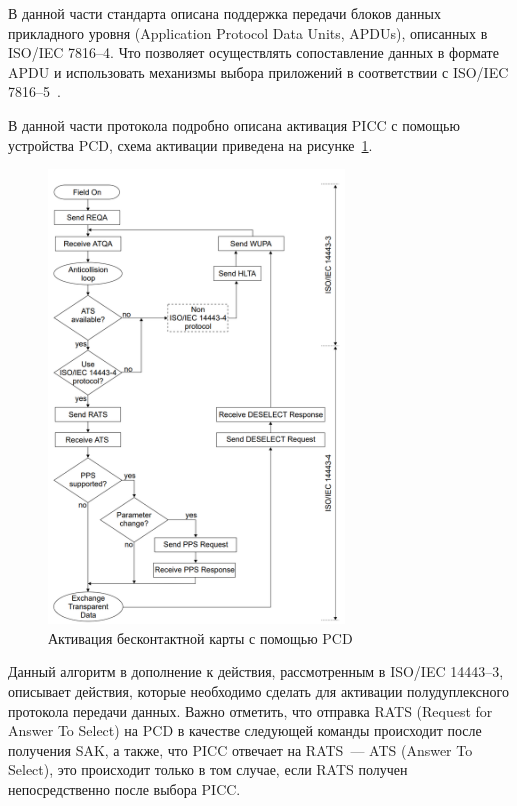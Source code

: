В данной части стандарта описана поддержка передачи блоков данных прикладного уровня (Application Protocol Data Units, APDUs), описанных в ISO/IEC 7816--4.
Что позволяет осуществлять сопоставление данных в формате APDU и использовать механизмы выбора приложений в соответствии с ISO/IEC 7816--5~\cite{iso_14443_en}.

В данной части протокола подробно описана активация PICC с помощью устройства PCD, схема активации приведена на рисунке~\ref{fig:pcd_flow_2_picc_activation}.


\begin{figure}[H]
    \centering
    \includegraphics[width=0.7\textwidth]{images/research/pcd_flow_2_picc_activation}
    \caption{\centering Активация бесконтактной карты с помощью PCD}
    \label{fig:pcd_flow_2_picc_activation}
\end{figure}

Данный алгоритм в дополнение к действия, рассмотренным в ISO/IEC 14443--3, описывает действия, которые необходимо сделать для активации полудуплексного протокола передачи данных.
Важно отметить, что отправка RATS (Request for Answer To Select) на PCD в качестве следующей команды происходит после получения SAK, а также, что PICC отвечает на RATS~--- ATS (Answer To Select), это происходит только в том случае, если RATS получен непосредственно после выбора PICC.

